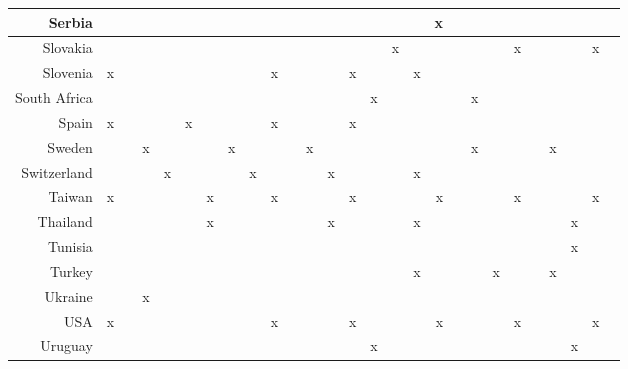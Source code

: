 {\begin{longtable}{|r|r|r|r|r|r|r|r|r|r|r|r|r|r|r|r|r|r|r|r|r|r|r|r|r|r|r|}
Serbia &     &     &     &     &     &     &     &     &     &     &     &     &     &     &     &     &    x &     &     &     &     &     &     &     &     &     \\ \midrule
Slovakia &     &     &     &     &     &     &     &     &     &     &     &     &     &     &    x &     &     &     &     &     &    x &     &     &     &    x &     \\ \midrule
Slovenia &    x &     &     &     &     &     &     &     &    x &     &     &     &    x &     &     &    x &     &     &     &     &     &     &     &     &     &     \\ \midrule
South Africa &     &     &     &     &     &     &     &     &     &     &     &     &     &    x &     &     &     &     &    x &     &     &     &     &     &     &     \\ \midrule
Spain &    x &     &     &     &    x &     &     &     &    x &     &     &     &    x &     &     &     &     &     &     &     &     &     &     &     &     &     \\ \midrule
Sweden &     &     &    x &     &     &     &    x &     &     &     &    x &     &     &     &     &     &     &     &    x &     &     &     &    x &     &     &     \\ \midrule
Switzerland &     &     &     &    x &     &     &     &    x &     &     &     &    x &     &     &     &    x &     &     &     &     &     &     &     &     &     &     \\ \midrule
Taiwan &    x &     &     &     &     &    x &     &     &    x &     &     &     &    x &     &     &     &    x &     &     &     &    x &     &     &     &    x &     \\ \midrule
Thailand &     &     &     &     &     &    x &     &     &     &     &     &    x &     &     &     &    x &     &     &     &     &     &     &     &    x &     &     \\ \midrule
Tunisia &     &     &     &     &     &     &     &     &     &     &     &     &     &     &     &     &     &     &     &     &     &     &     &    x &     &     \\ \midrule
Turkey &     &     &     &     &     &     &     &     &     &     &     &     &     &     &     &    x &     &     &     &    x &     &     &    x &     &     &     \\ \midrule
Ukraine &     &     &    x &     &     &     &     &     &     &     &     &     &     &     &     &     &     &     &     &     &     &     &     &     &     &     \\ \midrule
USA &    x &     &     &     &     &     &     &     &    x &     &     &     &    x &     &     &     &    x &     &     &     &    x &     &     &     &    x &     \\ \midrule
Uruguay &     &     &     &     &     &     &     &     &     &     &     &     &     &    x &     &     &     &     &     &     &     &     &     &    x &     &     \\   \bottomrule
		\end{longtable} }
